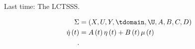 
Last time: The LCTSSS. 

\begin{align*}
	\Sigma &= \left( X, U, Y, \tdomain , \U, A, B , C, D \right) \\
		\dot{\eta}\left( t \right) &=  A\left( t \right) \eta\left( t \right)  + B\left( t \right) \mu\left( t \right)  \\

.\end{align*}
